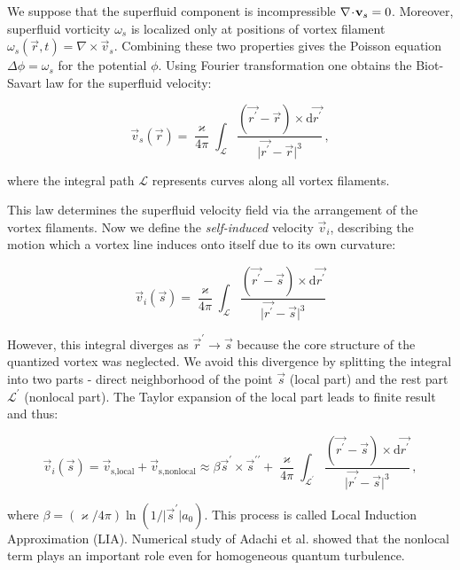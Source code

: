 We suppose that the superfluid component is incompressible $\nabla \!\cdot\! \mathbf{v}_s = 0$. Moreover, superfluid vorticity $\omega_s$ is localized only at positions of vortex filament $\omega_s(\vec{r},t) = \nabla \times \vec{v}_s$. Combining these two properties gives the Poisson equation $\Delta \phi = \omega_s$ for the potential $\phi$.
Using Fourier transformation one obtains the Biot-Savart law for the superfluid velocity:

\begin{equation}
\vec{v}_s(\vec{r}) = \frac{\varkappa}{4\pi} \int_{\mathcal{L}} \frac{(\vec{r^{\prime}} - \vec{r}) \times \text{d}\vec{r^{\prime}}}{\vert \vec{r^{\prime}} - \vec{r} \vert^3}\,,
\end{equation}

where the integral path $\mathcal{L}$ represents curves along all vortex filaments.

This law determines the superfluid velocity field via the arrangement of the vortex
filaments. Now we define the \textit{self-induced} velocity $\vec{v}_i$, describing the motion which a vortex line induces onto itself due to its own curvature:

\begin{equation}
\vec{v}_i(\vec{s}) = \frac{\varkappa}{4\pi} \int_{\mathcal{L}} \frac{(\vec{r^{\prime}} - \vec{s}) \times \text{d}\vec{r^{\prime}}}{\vert \vec{r^{\prime}} - \vec{s} \vert^3}
\end{equation}

However, this integral diverges as $\vec{r}^{\prime} \rightarrow \vec{s}$ because the core structure
of the quantized vortex was neglected. We avoid this divergence by splitting the integral into two parts - direct neighborhood of the point $\vec{s}$ (local part) and the rest part $\mathcal{L}^{\prime}$ (nonlocal part). The Taylor expansion of the local part leads to finite result and thus:

\begin{equation}
\vec{v}_i(\vec{s})
= \vec{v}_{\text{s,local}} + \vec{v}_{\text{s,nonlocal}}
\approx \beta \vec{s}^{\prime} \times \vec{s}^{\prime \prime} + \frac{\varkappa}{4\pi} \int_{\mathcal{L}^{\prime}} \frac{(\vec{r^{\prime}} - \vec{s}) \times \text{d}\vec{r^{\prime}}}{\vert \vec{r^{\prime}} - \vec{s} \vert^3}\,,
\end{equation}

where $\beta = (\varkappa / 4\pi) \ln(1/\vert\vec{s}^{\prime}\vert a_0)$. This process is called Local Induction Approximation (LIA). Numerical study of Adachi et al. showed that the nonlocal term plays an important role even for homogeneous quantum turbulence.

